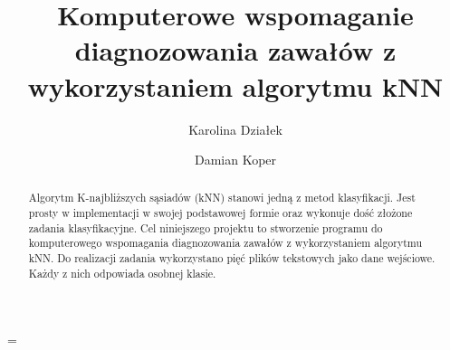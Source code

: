 \documentclass[runningheads]{llncs2e/llncs}
\begin{document}
\setlength{\tabcolsep}{5pt}
\tabulinesep=2.5pt
\LTcapwidth=\textwidth

\title{Komputerowe wspomaganie diagnozowania zawałów z wykorzystaniem algorytmu kNN}

%
%
\author{Karolina Działek \and
    Damian Koper
}
%
%
%
\maketitle              %
%
\begin{abstract}
    Algorytm K-najbliższych sąsiadów (kNN) stanowi jedną z metod klasyfikacji. Jest prosty w implementacji w swojej podstawowej formie oraz wykonuje dość złożone zadania klasyfikacyjne. Cel niniejszego projektu to stworzenie programu do komputerowego wspomagania diagnozowania zawałów z wykorzystaniem algorytmu kNN. Do realizacji zadania wykorzystano pięć plików tekstowych jako dane wejściowe. Każdy z nich odpowiada osobnej klasie.

\end{abstract}
%



\clearpage
%
%
%


%
\end{document}
